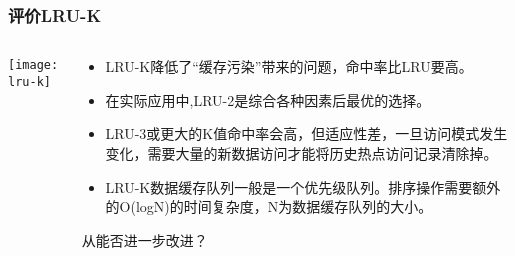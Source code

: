 \begin{frame}[plain]
	\frametitle{评价LRU-K}
	\begin{columns}
		\begin{column}{.4\textwidth}
			\centering
			\texttt{[image: lru-k]}
		\end{column}
		
		\begin{column}{.6\textwidth}
			
				\begin{itemize}
					
					\item LRU-K降低了“缓存污染”带来的问题，命中率比LRU要高。
					\item 在实际应用中,LRU-2是综合各种因素后最优的选择。
					\item LRU-3或更大的K值命中率会高，但适应性差，一旦访问模式发生变化，需要大量的新数据访问才能将历史热点访问记录清除掉。
					\item LRU-K数据缓存队列一般是一个优先级队列。排序操作需要额外的O(logN)的时间复杂度，N为数据缓存队列的大小。
					
				\end{itemize}
			\centering
			\large 从能否进一步改进？
		\end{column}
		
		
	\end{columns}
\end{frame}




